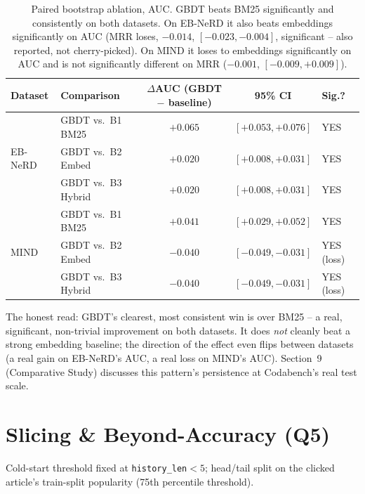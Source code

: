 \documentclass[11pt,a4paper]{article}
\begin{document}
\begin{table}[h]
\centering\small
\begin{tabular}{ll cc l}
\toprule
\textbf{Dataset} & \textbf{Comparison} & \textbf{$\Delta$AUC (GBDT $-$ baseline)} & \textbf{95\% CI} & \textbf{Sig.?} \\
\midrule
\multirow{3}{*}{EB-NeRD}
 & GBDT vs.\ B1 BM25   & $+0.065$ & $[+0.053, +0.076]$ & YES \\
 & GBDT vs.\ B2 Embed  & $+0.020$ & $[+0.008, +0.031]$ & YES \\
 & GBDT vs.\ B3 Hybrid & $+0.020$ & $[+0.008, +0.031]$ & YES \\
\midrule
\multirow{3}{*}{MIND}
 & GBDT vs.\ B1 BM25   & $+0.041$ & $[+0.029, +0.052]$ & YES \\
 & GBDT vs.\ B2 Embed  & $-0.040$ & $[-0.049, -0.031]$ & YES (loss) \\
 & GBDT vs.\ B3 Hybrid & $-0.040$ & $[-0.049, -0.031]$ & YES (loss) \\
\bottomrule
\end{tabular}
\caption{Paired bootstrap ablation, AUC. GBDT beats BM25 significantly and
consistently on both datasets. On EB-NeRD it also beats embeddings significantly on
AUC (MRR loses, $-0.014$, $[-0.023,-0.004]$, significant -- also reported, not
cherry-picked). On MIND it loses to embeddings significantly on AUC and is not
significantly different on MRR ($-0.001$, $[-0.009,+0.009]$).}
\label{tab:ablation}
\end{table}

The honest read: GBDT's clearest, most consistent win is over BM25 -- a real,
significant, non-trivial improvement on both datasets. It does \emph{not} cleanly beat
a strong embedding baseline; the direction of the effect even flips between datasets
(a real gain on EB-NeRD's AUC, a real loss on MIND's AUC). Section~9 (Comparative
Study) discusses this pattern's persistence at Codabench's real test scale.

\section{Slicing \& Beyond-Accuracy (Q5)}

Cold-start threshold fixed at \texttt{history\_len}$<5$; head/tail split on the
clicked article's train-split popularity (75th percentile threshold).
\end{document}
